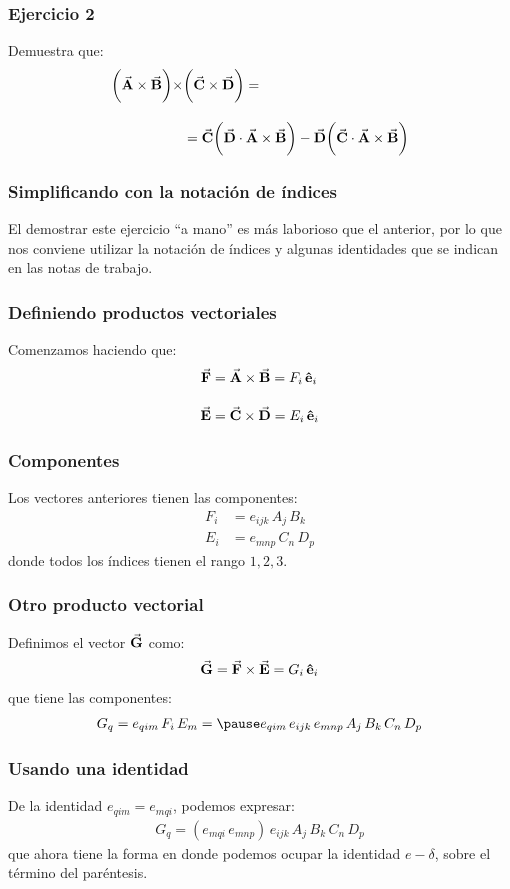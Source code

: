 \documentclass[12pt]{beamer}
\begin{document}
\begin{frame}
\frametitle{Ejercicio 2}
Demuestra que:
\begin{align*}
\bigg( \va{A} \times \va{B} \bigg) \times &\bigg( \va{C} \times \va{D} \bigg) = \\[1em] 
&= \va{C} \bigg( \va{D} \cdot \va{A} \times \va{B} \bigg) - \va{D} \bigg( \va{C} \cdot \va{A} \times \va{B} \bigg)
\end{align*}
\end{frame}
\begin{frame}
\frametitle{Simplificando con la notación de índices}
El demostrar este ejercicio \enquote{a mano} es más laborioso que el anterior, por lo que nos conviene utilizar la notación de índices y algunas identidades que se indican en las notas de trabajo.
\end{frame}
\begin{frame}
\frametitle{Definiendo productos vectoriales}
Comenzamos haciendo que:
\begin{align*}
\va{F} &= \va{A} \times \va{B} = F_{i} \, \vu{e}_{i} \\[1em]
\va{E} &= \va{C} \times \va{D} = E_{i} \, \vu{e}_{i}
\end{align*}
\end{frame}
\begin{frame}
\frametitle{Componentes}
Los vectores anteriores tienen las componentes:
\begin{align*}
F_{i} &= e_{ijk} \, A_{j} \, B_{k} \\[1em] 
E_{i} &= e_{mnp} \, C_{n} \, D_{p}
\end{align*}
donde todos los índices tienen el rango $1, 2, 3$.
\end{frame}
\begin{frame}
\frametitle{Otro producto vectorial}
Definimos el vector $\va{G}$ como:
\pause
\begin{align*}
\va{G} = \va{F} \times \va{E} = G_{i} \, \vu{e}_{i}
\end{align*}
\pause
que tiene las componentes:
\pause
\begin{eqnarray*}
G_{q} = e_{qim} \, F_{i} \, E_{m} = \pause e_{qim} \, e_{ijk} \, e_{mnp} \, A_{j} \, B_{k} \, C_{n} \, D_{p}
\end{eqnarray*}
\end{frame}
\begin{frame}
\frametitle{Usando una identidad}
De la identidad $e_{qim} = e_{mqi}$, podemos expresar:
\pause
\begin{align*}
G_{q} = (e_{mqi} \, e_{mnp}) \, e_{ijk} \, A_{j} \, B_{k} \, C_{n} \, D_{p}
\end{align*}
\pause
que ahora tiene la forma en donde podemos ocupar la identidad $e-\delta$, sobre el término del paréntesis.
\end{frame}
\end{document}
